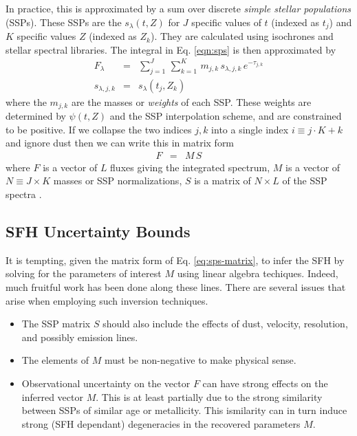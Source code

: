 \documentclass[iop,numberedappendix]{emulateapj}
\begin{document}
In practice, this is approximated by a sum over discrete \emph{simple stellar populations} (SSPs).  
These SSPs are the $s_\lambda(t, Z)$ for $J$ specific values of $t$ (indexed as $t_j$) and $K$ specific values $Z$ (indexed as $Z_k$).
They are calculated using isochrones and stellar spectral libraries.
The integral in Eq. \ref{eqn:sps} is then approximated by 
\begin{eqnarray}
F_\lambda & = & \sum_{j=1}^J \, \sum_{k=1}^{K} \, m_{j,k} \, s_{\lambda, j,k} \, e^{-\tau_{j,k}} \\
s_{\lambda, j,k} & = & s_\lambda(t_j, Z_k)
\end{eqnarray}
where the $m_{j,k}$ are the masses or \emph{weights} of each SSP.  
These weights are determined by $\psi(t, Z)$ and the SSP interpolation scheme, and are constrained to be positive.
If we collapse the two indices $j, k$ into a single index $i \equiv j\cdot K + k$ and ignore dust then we can write this in matrix form
\begin{eqnarray} \label{eqn:sps-matrix}
F & = & M \, S %
\end{eqnarray}
where $F$ is a vector of $L$ fluxes giving the integrated spectrum,
$M$ is a vector of $N\equiv J\times K$ masses or SSP normalizations,
$S$ is a matrix of $N \times L$ of the SSP spectra
.

\subsection{SFH Uncertainty Bounds}
It is tempting, given the matrix form of Eq. \ref{eq:sps-matrix}, to infer the SFH by solving for the parameters of interest $M$ using linear algebra techiques.
Indeed, much fruitful work has been done along these lines.
There are several issues that arise when employing such inversion techniques.
\begin{itemize}

\item The SSP matrix $S$ should also include the effects of dust, velocity, resolution, and possibly emission lines.

\item The elements of $M$ must be non-negative to make physical sense.

\item Observational uncertainty on the vector $F$ can have strong effects on the inferred vector $M$.  This is at least partially due to the strong similarity between SSPs of similar age or metallicity.  This ismilarity can in turn induce strong (SFH dependant) degeneracies in the recovered parameters $M$.

\end{itemize}
\end{document}
